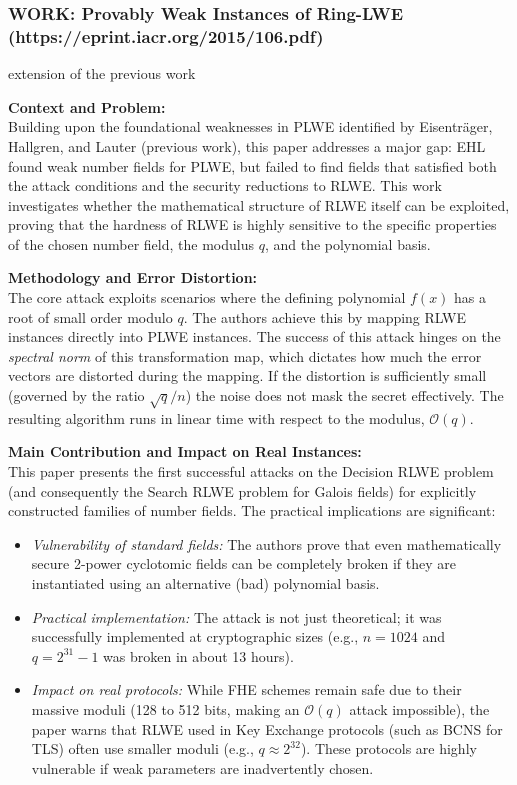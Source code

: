 \subsubsection{WORK: Provably Weak Instances of Ring-LWE (https://eprint.iacr.org/2015/106.pdf)}

extension of the previous work

\textbf{Context and Problem:} \\
Building upon the foundational weaknesses in PLWE identified by Eisenträger, Hallgren, and Lauter (previous work), this paper addresses a major gap: EHL found weak number fields for PLWE, but failed to find fields that satisfied both the attack conditions and the security reductions to RLWE. This work investigates whether the mathematical structure of RLWE itself can be exploited, proving that the hardness of RLWE is highly sensitive to the specific properties of the chosen number field, the modulus $q$, and the polynomial basis.

\textbf{Methodology and Error Distortion:} \\
The core attack exploits scenarios where the defining polynomial $f(x)$ has a root of small order modulo $q$. The authors achieve this by mapping RLWE instances directly into PLWE instances. The success of this attack hinges on the \textit{spectral norm} of this transformation map, which dictates how much the error vectors are distorted during the mapping. If the distortion is sufficiently small (governed by the ratio $\sqrt{q}/n$) the noise does not mask the secret effectively. The resulting algorithm runs in linear time with respect to the modulus, $\mathcal{O}(q)$.

\textbf{Main Contribution and Impact on Real Instances:} \\
This paper presents the first successful attacks on the Decision RLWE problem (and consequently the Search RLWE problem for Galois fields) for explicitly constructed families of number fields. The practical implications are significant:
\begin{itemize}
    \item \textit{Vulnerability of standard fields:} The authors prove that even mathematically secure 2-power cyclotomic fields can be completely broken if they are instantiated using an alternative (bad) polynomial basis.
    \item \textit{Practical implementation:} The attack is not just theoretical; it was successfully implemented at cryptographic sizes (e.g., $n=1024$ and $q = 2^{31}-1$ was broken in about 13 hours).
    \item \textit{Impact on real protocols:} While FHE schemes remain safe due to their massive moduli (128 to 512 bits, making an $\mathcal{O}(q)$ attack impossible), the paper warns that RLWE used in Key Exchange protocols (such as BCNS for TLS) often use smaller moduli (e.g., $q \approx 2^{32}$). These protocols are highly vulnerable if weak parameters are inadvertently chosen.
\end{itemize}


